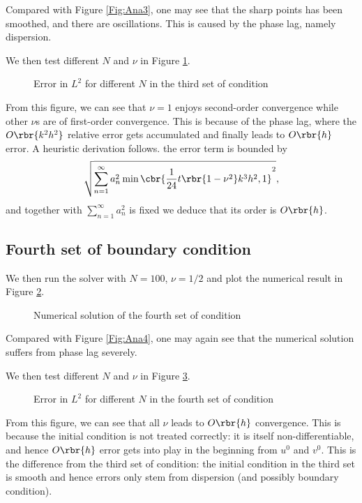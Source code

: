 \documentclass[english, nochinese]{pnote}
\begin{document}
Compared with Figure \ref{Fig:Ana3}, one may see that the sharp points has been smoothed, and there are oscillations. This is caused by the phase lag, namely dispersion.

We then test different $N$ and $\nu$ in Figure \ref{Fig:Comp3}.

\begin{figure}[htbp]
\centering
\scalebox{0.7}{}
\caption{Error in $L^2$ for different $N$ in the third set of condition}
\label{Fig:Comp3}
\end{figure}

From this figure, we can see that $ \nu = 1 $ enjoys second-order convergence while other $\nu$s are of first-order convergence. This is because of the phase lag, where the $ O \rbr{ k^2 h^2 } $ relative error gets accumulated and finally leads to $ O \rbr{h} $ error. A heuristic derivation follows. the error term is bounded by
\begin{equation}
\sqrt{ \sum_{ n = 1 }^{\infty} a_n^2 \min \cbr{ \frac{1}{24} t \rbr{ 1 - \nu^2 } k^3 h^2, 1 }^2 },
\end{equation}
and together with $ \sum_{ n = 1 }^{\infty} a_n^2 $ is fixed we deduce that its order is $ O \rbr{h} $.

\subsection{Fourth set of boundary condition}

We then run the solver with $ N = 100 $, $ \nu = 1 / 2 $ and plot the numerical result in Figure \ref{Fig:Num4}.

\begin{figure}[htbp]
\centering

\caption{Numerical solution of the fourth set of condition}
\label{Fig:Num4}
\end{figure}

Compared with Figure \ref{Fig:Ana4}, one may again see that the numerical solution suffers from phase lag severely.

We then test different $N$ and $\nu$ in Figure \ref{Fig:Comp4}.

\begin{figure}[htbp]
\centering
\scalebox{0.7}{}
\caption{Error in $L^2$ for different $N$ in the fourth set of condition}
\label{Fig:Comp4}
\end{figure}

From this figure, we can see that all $\nu$ leads to $ O \rbr{h} $ convergence. This is because the initial condition is not treated correctly: it is itself non-differentiable, and hence $ O \rbr{h} $ error gets into play in the beginning from $u^0$ and $v^0$. This is the difference from the third set of condition: the initial condition in the third set is smooth and hence errors only stem from dispersion (and possibly boundary condition).
\end{document}
